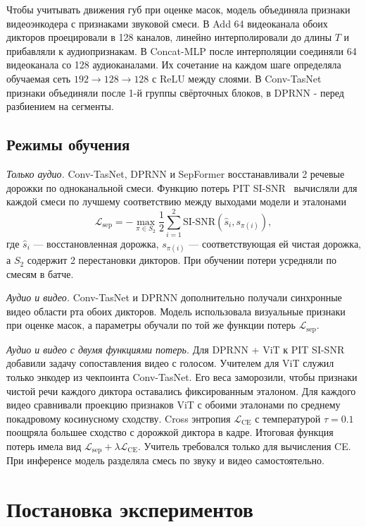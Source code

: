 \documentclass[10pt,conference,compsocconf]{IEEEtran}
\begin{document}
Чтобы учитывать движения губ при оценке масок, модель объединяла признаки видеоэнкодера с признаками звуковой смеси. В Add 64 видеоканала обоих дикторов проецировали в 128 каналов, линейно интерполировали до длины $T$ и прибавляли к аудиопризнакам. В Concat-MLP после интерполяции соединяли 64 видеоканала со 128 аудиоканалами. Их сочетание на каждом шаге определяла обучаемая сеть $192\!\rightarrow\!128\!\rightarrow\!128$ с ReLU между слоями. В Conv-TasNet признаки объединяли после 1-й группы свёрточных блоков, в DPRNN - перед разбиением на сегменты.

\subsection{Режимы обучения}

\textit{Только аудио.} Conv-TasNet, DPRNN и SepFormer восстанавливали 2 речевые дорожки по одноканальной смеси. Функцию потерь PIT SI-SNR~\cite{kolbaek2017upit} вычисляли для каждой смеси по лучшему соответствию между выходами модели и эталонами
\[
\mathcal{L}_{\mathrm{sep}}=-\max_{\pi\in S_2}\frac{1}{2}\sum_{i=1}^{2}\text{SI-SNR}(\hat{s}_i,s_{\pi(i)}),
\]
где $\hat{s}_i$ --- восстановленная дорожка, $s_{\pi(i)}$ --- соответствующая ей чистая дорожка, а $S_2$ содержит 2 перестановки дикторов. При обучении потери усредняли по смесям в батче.

\textit{Аудио и видео.} Conv-TasNet и DPRNN дополнительно получали синхронные видео области рта обоих дикторов. Модель использовала визуальные признаки при оценке масок, а параметры обучали по той же функции потерь $\mathcal{L}_{\mathrm{sep}}$.

\textit{Аудио и видео с двумя функциями потерь.} Для DPRNN + ViT к PIT SI-SNR добавили задачу сопоставления видео с голосом. Учителем для ViT служил только энкодер из чекпоинта Conv-TasNet. Его веса заморозили, чтобы признаки чистой речи каждого диктора оставались фиксированным эталоном. Для каждого видео сравнивали проекцию признаков ViT с обоими эталонами по среднему покадровому косинусному сходству. Cross энтропия $\mathcal{L}_{\mathrm{CE}}$ с температурой $\tau=0.1$ поощряла большее сходство с дорожкой диктора в кадре. Итоговая функция потерь имела вид $\mathcal{L}_{\mathrm{sep}}+\lambda\mathcal{L}_{\mathrm{CE}}$. Учитель требовался только для вычисления CE. При инференсе модель разделяла смесь по звуку и видео самостоятельно.

\section{Постановка экспериментов}\label{sec:experimental_setup}
\end{document}
